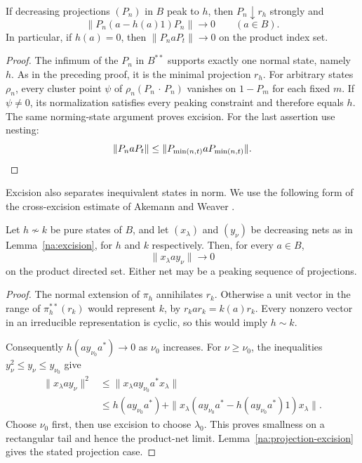 \begin{lemma}\label{na:projection-excision}
If decreasing projections $(P_n)$ in $B$ peak to $h$, then
$P_n\downarrow r_h$ strongly and
\[
 \|P_n(a-h(a)1)P_n\|\longrightarrow0\qquad(a\in B).
\]
In particular, if $h(a)=0$, then $\|P_n a P_t\|\to0$ on the product
index set.
\end{lemma}
\begin{proof}
The infimum of the $P_n$ in $B^{**}$ supports exactly one normal state,
namely $h$.  As in the preceding proof, it is the minimal projection
$r_h$.  For arbitrary states $\rho_n$, every cluster point $\psi$ of
$\rho_n(P_n\,\cdot\,P_n)$ vanishes on $1-P_m$ for each fixed $m$.
If $\psi\ne0$, its normalization satisfies every peaking constraint and
therefore equals $h$.  The same norming-state argument proves excision.
For the last assertion use nesting:
\[
 \|P_n a P_t\|\le \|P_{\min(n,t)}aP_{\min(n,t)}\|.
\qedhere
\]
\end{proof}

Excision also separates inequivalent states in norm.  We use the following
form of the cross-excision estimate of Akemann and Weaver
\cite[Lemma~1]{AkemannWeaver2004}.

\begin{lemma}\label{na:cross-excision}
Let $h\not\sim k$ be pure states of $B$, and let $(x_\lambda)$ and
$(y_\nu)$ be decreasing nets as in Lemma~\ref{na:excision}, for $h$ and
$k$ respectively.  Then, for every $a\in B$,
\begin{equation}\label{eq:cross-excision}
 \|x_\lambda a y_\nu\|\longrightarrow0
\end{equation}
on the product directed set.  Either net may be a peaking sequence of
projections.
\end{lemma}
\begin{proof}
The normal extension of $\pi_h$ annihilates $r_k$.  Otherwise a unit vector
in the range of $\pi_h^{**}(r_k)$ would represent $k$, by
$r_kar_k=k(a)r_k$.  Every nonzero vector in an irreducible representation
is cyclic, so this would imply $h\sim k$.

Consequently $h(ay_{\nu_0}a^*)\to0$ as $\nu_0$ increases.  For
$\nu\ge\nu_0$, the inequalities $y_\nu^2\le y_\nu\le y_{\nu_0}$ give
\begin{align*}
 \|x_\lambda a y_\nu\|^2
 &\le \|x_\lambda a y_{\nu_0}a^*x_\lambda\|\\
 &\le h(ay_{\nu_0}a^*)
   +\|x_\lambda(ay_{\nu_0}a^*-h(ay_{\nu_0}a^*)1)x_\lambda\|.
\end{align*}
Choose $\nu_0$ first, then use excision to choose $\lambda_0$.
This proves smallness on a rectangular tail and hence the product-net
limit.  Lemma~\ref{na:projection-excision} gives the stated projection
case.
\end{proof}

